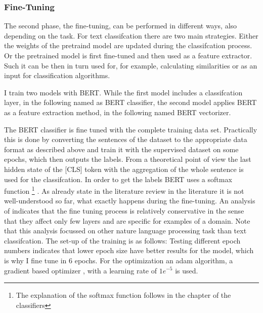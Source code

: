 \documentclass[12pt, a4paper, titlepage]{article}
\begin{document}
\subsubsection*{Fine-Tuning}
The second phase, the fine-tuning, can be performed in different ways, also depending on the task. For text classifcation there are two main strategies. Either the weights of the pretraind model are updated during the classifcation process. Or the pretrained model is first fine-tuned and then used as a feature extractor.  Such it can be then in turn used for, for example, calculating similarities or as an input for classification algorithms. 

I train two models with \ac{BERT}. While the first model includes a classifcation layer, in the following named as \ac{BERT} classifier, the second model applies \ac{BERT} as a feature extraction method, in the following named \ac{BERT} vectorizer. 

The \ac{BERT} classifier is fine tuned with the complete training data set. Practically this is done by converting the sentences of the dataset to the appropriate data format as described above and train it with the supervised dataset on some epochs, which then outputs  the labels. From a theoretical point of view the last hidden state of the [CLS] token with the aggregation of the whole sentence is used for the classifcation. In order to get the labels \ac{BERT} uses a softmax function \footnote{The explanation of the softmax function follows in the chapter of the classifiers} \citep{sun2019}. As already state in the literature review in the literature it is not well-understood so far, what exactly happens during the fine-tuning. An analysis of \citet{merchant2020} indicates that the fine tuning process is relatively conservative in the sense that they affect only few layers and are specific for examples of a domain. Note that this analysis focussed on other nature language processing task than text classifcation. The set-up of the training is as follows: Testing different epoch numbers indicates that lower epoch size have better results for the model, which is why I fine tune in 6 epochs. For the optimization an adam algorithm, a gradient based optimizer \citep{kingma2014}, with a learning rate of $1e^{-5}$ is used. 
\end{document}

